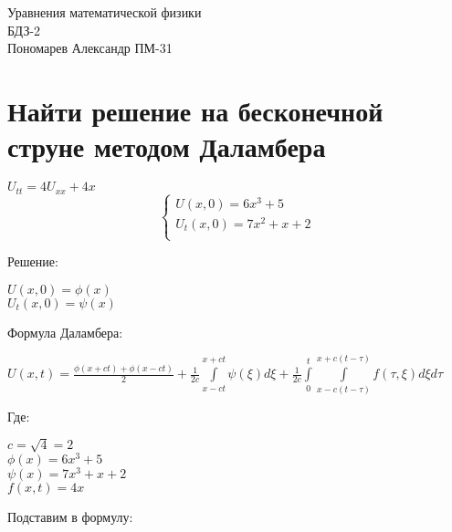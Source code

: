 \documentclass{article}
\begin{document}
	\begin{titlepage}
		\centering
		\huge {Уравнения математической физики \\ БДЗ-2} \\
		\Large {Пономарев Александр ПМ-31} \\
	\end{titlepage}
	
    \section{Найти решение на бесконечной струне методом Даламбера}
    \begin{center}
        $ U_{tt} = 4U_{xx} + 4x $
		\begin{equation*} 
            \begin{cases}
                U(x, 0) = 6x^3 + 5 \\
                U_t(x, 0) = 7x^2+x+2 \\
            \end{cases}
		\end{equation*}
	\end{center}
    Решение:
    \begin{center}
        $ U(x, 0) = \phi(x) $ \\
        $ U_t(x, 0) = \psi(x) $ \\
	\end{center}
    Формула Даламбера:
    \begin{center}
        $  U(x,t)={\frac {\phi (x+ct)+\phi (x-ct)}{2}}+{\frac {1}{2c}}  \int\limits_{x-ct}^{x+ct}\psi(\xi)d\xi + \frac{1}{2c}\int\limits_0^t \int\limits_{x-c(t-\tau)}^{x+c(t-\tau)}f(\tau, \xi)d\xi d\tau $ \\
    \end{center}
    Где:
    \begin{center}
        $ c = \sqrt{4} = 2 $ \\
        $ \phi(x) = 6x^3+5 $ \\
        $ \psi(x) = 7x^3+ x + 2 $ \\
        $ f(x, t) = 4x $ \\
    \end{center}
    Подставим в формулу:
\end{document}
